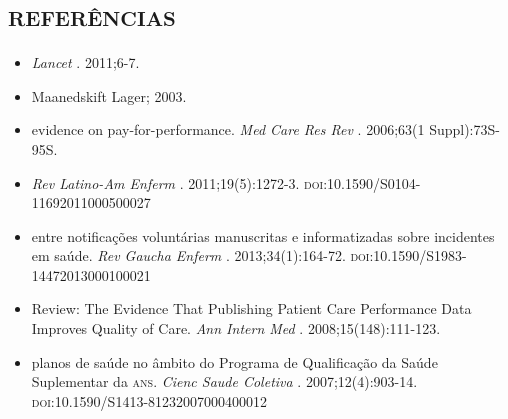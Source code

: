 \documentclass{article}
\begin{document}
\section*{%
\textsc{referências}}
\begin{itemize}

\item[%
1] %
\textit{Lancet}
 . 2011;6-7.  

\item[%
2] %
          Maanedskift Lager; 2003.  

\item[%
3] %
          evidence on pay-for-performance. %
\textit{Med Care Res Rev}
 . 2006;63(1
          Suppl):73S-95S.  

\item[%
4] %
\textit{Rev
            Latino-Am Enferm}
 . 2011;19(5):1272-3.
          \textsc{doi}:10.1590/S0104-11692011000500027  

\item[%
5] %
          entre notificações voluntárias manuscritas e informatizadas sobre incidentes em saúde.
\textit{Rev Gaucha Enferm}
 . 2013;34(1):164-72.
          \textsc{doi}:10.1590/S1983-14472013000100021  

\item[%
6] %
          Review: The Evidence That Publishing Patient Care Performance Data Improves Quality of
          Care. %
\textit{Ann Intern Med}
 . 2008;15(148):111-123.  

\item[%
7] %
          planos de saúde no âmbito do Programa de Qualificação da Saúde Suplementar da \textsc{ans}.
\textit{Cienc Saude Coletiva}
 . 2007;12(4):903-14.
          \textsc{doi}:10.1590/S1413-81232007000400012  


\end{itemize}
\end{document}
